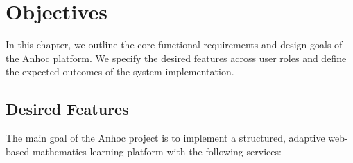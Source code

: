 \chapter{Objectives}

In this chapter, we outline the core functional requirements and design goals of the Anhoc platform. We specify the desired features across user roles and define the expected outcomes of the system implementation.

\section{Desired Features}

The main goal of the Anhoc project is to implement a structured, adaptive web-based mathematics learning platform with the following services:

